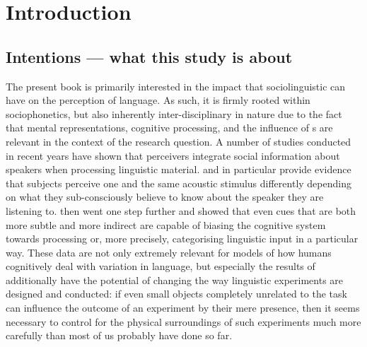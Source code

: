 \chapter{Introduction}
\label{ch.intro}

\section{Intentions --- what this study is about}
\label{sec.intro.intent}

The present book is primarily interested in the impact that sociolinguistic  can have on the perception of language.
As such, it is firmly rooted within sociophonetics, but also inherently inter-disciplinary in nature due to the fact that mental representations, cognitive processing, and the influence of s are relevant in the context of the research question.
A number of studies conducted in recent years have shown that perceivers integrate social information about speakers when processing linguistic material.
\textcite{niedzielski1999} and \textcite{hayetal2006a} in particular provide evidence that subjects perceive one and the same acoustic stimulus differently depending on what they sub-consciously believe to know about the speaker they are listening to.
\textcite{haydrager2010} then went one step further and showed that even cues that are both more subtle and more indirect are capable of biasing the cognitive system towards processing or, more precisely, categorising linguistic input in a particular way.
These data are not only extremely relevant for models of how humans cognitively deal with variation in language, but especially the results of \textcite{haydrager2010} additionally have the potential of changing the way linguistic experiments are designed and conducted: if even small objects completely unrelated to the task can influence the outcome of an experiment by their mere presence, then it seems necessary to control for the physical surroundings of such experiments much more carefully than most of us probably have done so far.

